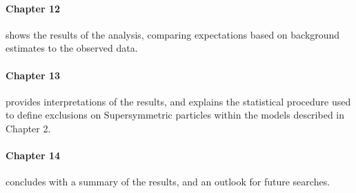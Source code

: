\paragraph{Chapter 12} shows the results of the analysis, comparing expectations based on background estimates to the observed data. 

\paragraph{Chapter 13} provides interpretations of the results, and explains the statistical procedure used to define exclusions on Supersymmetric particles within the models described in Chapter 2. 

\paragraph{Chapter 14} concludes with a summary of the results, and an outlook for future searches. 
